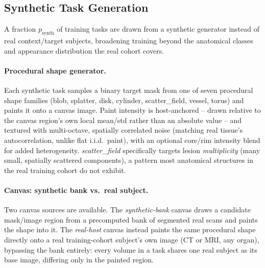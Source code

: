 \subsection{Synthetic Task Generation}\label{sec:methodology-synth}

A fraction $p_{\text{synth}}$ of training tasks are drawn from a synthetic
generator instead of real context/target subjects, broadening training
beyond the anatomical classes and appearance distribution the real
cohort covers.

\paragraph{Procedural shape generator.} Each synthetic task samples a
binary target mask from one of seven procedural shape families (blob,
splatter, disk, cylinder, scatter\_field, vessel, torus) and paints it
onto a canvas image. Paint intensity is host-anchored -- drawn relative
to the canvas region's own local mean/std rather than an absolute value
-- and textured with multi-octave, spatially correlated noise (matching
real tissue's autocorrelation, unlike flat i.i.d.\ paint), with an
optional core/rim intensity blend for added heterogeneity.
\emph{scatter\_field} specifically targets lesion \emph{multiplicity}
(many small, spatially scattered components), a pattern most
anatomical structures in the real training cohort do not exhibit.

\paragraph{Canvas: synthetic bank vs.\ real subject.} Two canvas sources
are available. The \emph{synthetic-bank} canvas draws a candidate
mask/image region from a precomputed bank of segmented real scans and
paints the shape into it. The \emph{real-host} canvas instead paints the
same procedural shape directly onto a real training-cohort subject's own
image (CT or MRI, any organ), bypassing the bank entirely: every volume
in a task shares one real subject as its base image, differing only in
the painted region.
